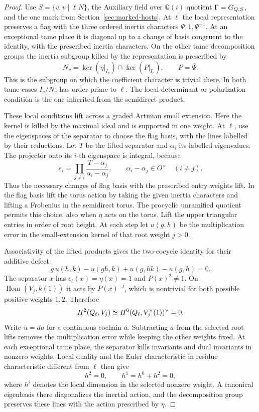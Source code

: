 \begin{proof}
Use \(S=\{v:v\mid\ell N\}\), the Auxiliary field over \(\mathbb Q(i)\) quotient
\(\Gamma=G_{Q,S}\), and the one mark from
Section~\ref{sec:marked-hosts}. At \(\ell\) the local
representation preserves a flag with the three ordered
inertia characters \(\Psi,1,\Psi^{-1}\). At an exceptional
tame place it is diagonal up to a change of basis
congruent to the identity, with the prescribed inertia
characters. On the other tame decomposition groups the inertia subgroup killed by the representation is prescribed by
\[
 N_v=\ker(\eta|_{I_v})\cap\ker(P|_{I_v}),\qquad P=\bar\Psi .
\] This is the subgroup on which the
coefficient character is trivial there. In both tame
cases \(I_v/N_v\) has order prime to \(\ell\).
The local determinant or polarization condition is the
one inherited from the semidirect product.

These local conditions lift across a graded Artinian
small extension. Here the kernel is killed by the
maximal ideal and is supported in one weight. At
\(\ell\), use the eigenspaces of the separator to
choose the flag basis, with the lines labelled by their
reductions. Let \(T\) be the lifted separator and \(\alpha_i\) its labelled eigenvalues. The projector onto its \(i\)-th eigenspace is integral, because
\[
 e_i=\prod_{j\ne i}\frac{T-\alpha_j}{\alpha_i-\alpha_j},\qquad \alpha_i-\alpha_j\in O^\times\quad(i\ne j).
\]
Thus the necessary changes of flag basis with the prescribed entry weights lift. In the flag basis lift the torus
action by taking the given inertia characters and
lifting a Frobenius in the semidirect torus. The
procyclic unramified quotient permits this choice,
also when \(\eta\) acts on the torus. Lift the
upper triangular entries in order of root height.
At each step let \(u(g,h)\) be the multiplication error in
the small-extension kernel of that root weight \(j>0\).

Associativity of the lifted products gives the two-cocycle identity for their additive defect:
\[
 g\,u(h,k)-u(gh,k)+u(g,hk)-u(g,h)=0 .
\] The separator \(x\) has
\(\bar\epsilon_\ell(x)=\eta(x)=1\) and \(P(x)^2\ne1\).
On \(\operatorname{Hom}(V_j,k(1))\) it acts by \(P(x)^{-j}\),
which is nontrivial for both possible positive weights \(1,2\).
Therefore
\[
 H^2(Q_\ell,V_j)\simeq H^0(Q_\ell,V_j^\vee(1))^\vee=0.
\]
Write \(u=da\) for a continuous cochain \(a\). Subtracting
\(a\) from the selected root lifts removes the multiplication
error while keeping the other weights fixed. At each exceptional tame place, the separator kills invariants and dual invariants in nonzero weights. Local duality and the Euler characteristic in residue characteristic different from \(\ell\) then give 
\[
 h^2=0,\qquad h^1=h^0+h^2=0,
\]
 where \(h^i\) denotes the local dimension in the selected nonzero weight. A canonical
eigenbasis there diagonalizes the inertial action,
and the decomposition group preserves these lines
with the action prescribed by \(\eta\).


\end{proof}

